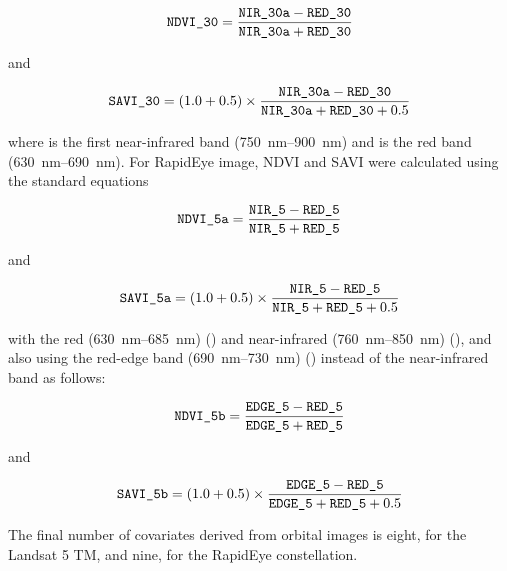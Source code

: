 \begin{equation}
  \texttt{NDVI\_30} = \frac{\texttt{NIR\_30a} - \texttt{RED\_30}}{\texttt{NIR\_30a} + \texttt{RED\_30}}
\end{equation}\label{eq:NDVI30}

\noindent and

\begin{equation}
  \texttt{SAVI\_30} = (1.0 + 0.5) \times \frac{\texttt{NIR\_30a} - \texttt{RED\_30}}{\texttt{NIR\_30a} + 
  \texttt{RED\_30} + 0.5}
\end{equation}\label{eq:SAVI30}

\noindent where  is the first near-infrared band (\SIrange{750}{900}{\nm}) and  
is the red band (\SIrange{630}{690}{\nm}). For RapidEye image, NDVI and SAVI were calculated using the 
standard equations

\begin{equation}
  \texttt{NDVI\_5a} = \frac{\texttt{NIR\_5} - \texttt{RED\_5}}{\texttt{NIR\_5} + \texttt{RED\_5}}
\end{equation}\label{eq:NDVI5a}

\noindent and

\begin{equation}
  \texttt{SAVI\_5a} = (1.0 + 0.5) \times \frac{\texttt{NIR\_5} - \texttt{RED\_5}}{\texttt{NIR\_5} + \texttt{RED\_5} 
  + 0.5}
\end{equation}\label{eq:SAVI5a}

\noindent with the red (\SIrange{630}{685}{\nm}) () and near-infrared (\SIrange{760}{850}{\nm}) 
(), and also using the red-edge band (\SIrange{690}{730}{\nm}) () instead of the 
near-infrared band as follows:

\begin{equation}
  \texttt{NDVI\_5b} = \frac{\texttt{EDGE\_5} - \texttt{RED\_5}}{\texttt{EDGE\_5} + \texttt{RED\_5}}
\end{equation}\label{eq:NDVI5a}

\noindent and

\begin{equation}
  \texttt{SAVI\_5b} = (1.0 + 0.5) \times \frac{\texttt{EDGE\_5} - \texttt{RED\_5}}{\texttt{EDGE\_5} + 
  \texttt{RED\_5} + 0.5}
\end{equation}\label{eq:SAVI5a}

The final number of covariates derived from orbital images is eight, for the Landsat 5 TM, and nine, for 
the RapidEye constellation.
